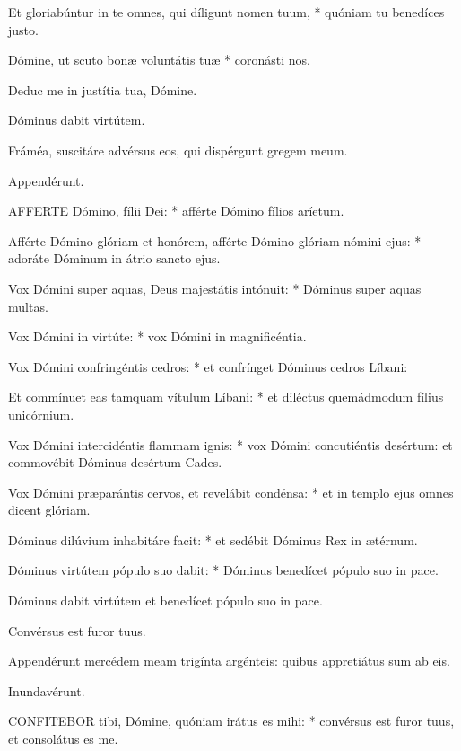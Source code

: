 Et gloriabúntur in te omnes, qui díligunt nomen tuum, * quóniam tu benedíces justo.

Dómine, ut scuto bonæ voluntátis tuæ * coronásti nos.

 Deduc me in justítia tua, Dómine.

 Dóminus dabit virtútem.


 Fráméa, suscitáre advérsus eos, qui dispérgunt gregem meum.

 Appendérunt.


\lettrine[lines=2]{A}{FFERTE} Dómino, fílii Dei: * afférte Dómino fílios aríetum.

Afférte Dómino glóriam et honórem, afférte Dómino glóriam nómini ejus: * adoráte Dóminum in átrio sancto ejus.

Vox Dómini super aquas, Deus majestátis intónuit: * Dóminus super aquas multas.

Vox Dómini in virtúte: * vox Dómini in magnificéntia.

Vox Dómini confringéntis cedros: * et confrínget Dóminus cedros Líbani:

Et commínuet eas tamquam vítulum Líbani: * et diléctus quemádmodum fílius unicórnium.

Vox Dómini intercidéntis flammam ignis: * vox Dómini concutiéntis desértum: et commovébit Dóminus desértum Cades.

Vox Dómini præparántis cervos, et revelábit condénsa: * et in templo ejus omnes dicent glóriam.

Dóminus dilúvium inhabitáre facit: * et sedébit Dóminus Rex in ætérnum.

Dóminus virtútem pópulo suo dabit: * Dóminus benedícet pópulo suo in pace.

 Dóminus dabit virtútem et benedícet pópulo suo in pace.

 Convérsus est furor tuus.


 Appendérunt mercédem meam trigínta argénteis: quibus appretiátus sum ab eis.

 Inundavérunt.


\lettrine[lines=2]{C}{ONFITEBOR} tibi, Dómine, quóniam irátus es mihi: * convérsus est furor tuus, et consolátus es me.


